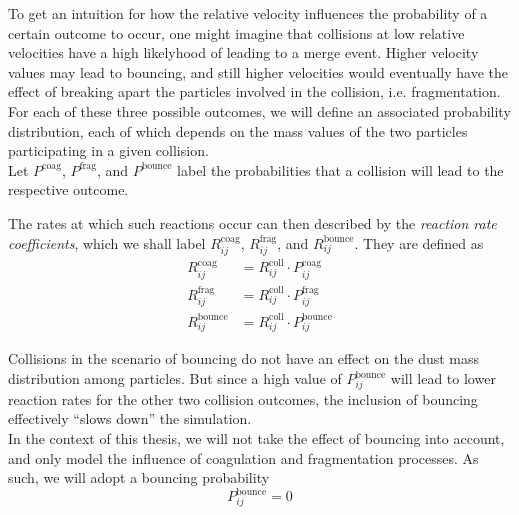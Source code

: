         To get an intuition for how the relative velocity influences the probability of a 
        certain outcome to occur, one might imagine that collisions at low relative velocities have 
        a high likelyhood of leading to a merge event. Higher velocity values may lead to 
        bouncing, and still higher velocities would eventually have the effect 
        of breaking apart the particles involved in the collision, i.e. fragmentation. \\

        For each of these three possible outcomes, we will define an associated probability 
        distribution, each of which depends on the mass values of the two particles participating 
        in a given collision. \\

        Let $P^\text{coag}$, $P^\text{frag}$, and $P^\text{bounce}$
        label the probabilities that a collision will lead to the respective outcome. \\

        \clearpage

        The rates at which such reactions occur can then described by the 
        \textit{reaction rate coefficients}, which we shall label 
        $R_{ij}^\text{coag}$, $R_{ij}^\text{frag}$, and $R_{ij}^\text{bounce}$. 
        They are defined as 
        \begin{align}
            R^\text{coag}_{ij}   &= R^\text{coll}_{ij} \cdot P^\text{coag}_{ij} \\
            R^\text{frag}_{ij}   &= R^\text{coll}_{ij} \cdot P^\text{frag}_{ij} \\
            R^\text{bounce}_{ij} &= R^\text{coll}_{ij} \cdot P^\text{bounce}_{ij}
        \end{align}

        Collisions in the scenario of bouncing do not have an effect on the dust mass distribution
        among particles. But since a high value of $P^\text{bounce}_{ij}$ will lead to lower 
        reaction rates for the other two collision outcomes, the inclusion of bouncing effectively 
        ``slows down'' the simulation. \\

        In the context of this thesis, we will not take the effect of bouncing into account, and 
        only model the influence of coagulation and fragmentation processes. As such, we will adopt 
        a bouncing probability 
        \begin{equation}
            P_{ij}^\text{bounce}=0 
        \end{equation}

